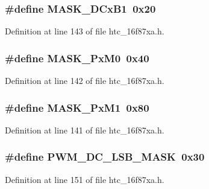 \subsubsection[{M\-A\-S\-K\-\_\-\-D\-Cx\-B1}]{\setlength{\rightskip}{0pt plus 5cm}\#define M\-A\-S\-K\-\_\-\-D\-Cx\-B1~0x20}\label{htc__16f87xa_8h_a325c21471753af87f5b0fee4e314265f}


Definition at line 143 of file htc\-\_\-16f87xa.\-h.

\subsubsection[{M\-A\-S\-K\-\_\-\-Px\-M0}]{\setlength{\rightskip}{0pt plus 5cm}\#define M\-A\-S\-K\-\_\-\-Px\-M0~0x40}\label{htc__16f87xa_8h_a11f6f1981c4b9c988e51713473ab5b63}


Definition at line 142 of file htc\-\_\-16f87xa.\-h.

\subsubsection[{M\-A\-S\-K\-\_\-\-Px\-M1}]{\setlength{\rightskip}{0pt plus 5cm}\#define M\-A\-S\-K\-\_\-\-Px\-M1~0x80}\label{htc__16f87xa_8h_a3b48f96c1ce295ffc2c6d7eb0e47ae26}


Definition at line 141 of file htc\-\_\-16f87xa.\-h.

\subsubsection[{P\-W\-M\-\_\-\-D\-C\-\_\-\-L\-S\-B\-\_\-\-M\-A\-S\-K}]{\setlength{\rightskip}{0pt plus 5cm}\#define P\-W\-M\-\_\-\-D\-C\-\_\-\-L\-S\-B\-\_\-\-M\-A\-S\-K~0x30}\label{htc__16f87xa_8h_af5e937602765d914e4f8b850aca73964}


Definition at line 151 of file htc\-\_\-16f87xa.\-h.

